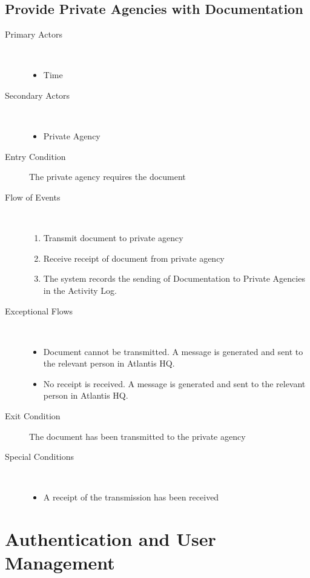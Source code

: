 \documentclass[a4paper,10pt]{report}
\begin{document}
\section{Provide Private Agencies with Documentation}
\begin{description}
\item[Primary Actors] \
  \begin{itemize}
    \item Time
  \end{itemize}
\item[Secondary Actors] \
  \begin{itemize}
    \item Private Agency
  \end{itemize}
\item[Entry Condition]
  The private agency requires the document
\item[Flow of Events] \
  \begin{enumerate}
    \item Transmit document to private agency
    \item Receive receipt of document from private agency
    \item The system records the sending of Documentation to Private Agencies in the Activity Log.
  \end{enumerate}
\item[Exceptional Flows] \
  \begin{itemize}
    \item Document cannot be transmitted. A message is generated and sent to the relevant person in Atlantis HQ.
    \item No receipt is received. A message is generated and sent to the relevant person in Atlantis HQ.
  \end{itemize}
\item[Exit Condition]
  The document has been transmitted to the private agency
\item[Special Conditions] \
  \begin{itemize}
    \item A receipt of the transmission has been received
  \end{itemize}
\end{description}


\chapter{Authentication and User Management}
\end{document}
